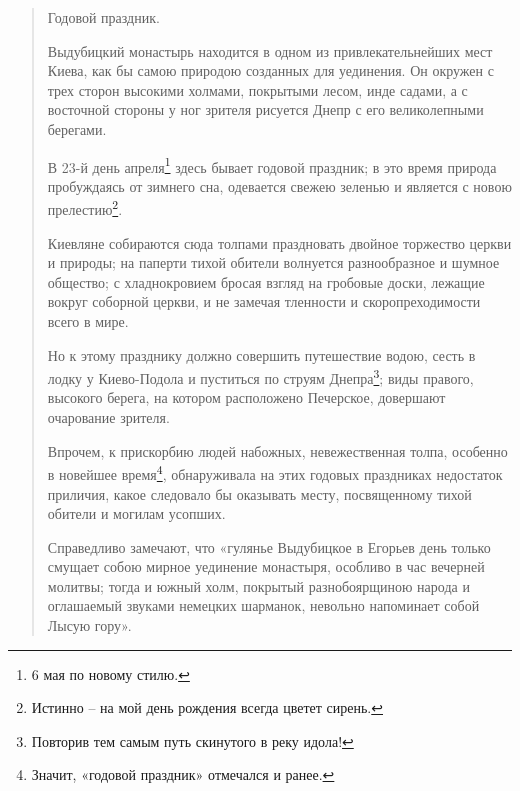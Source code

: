 \begin{quotation}
Годовой праздник.

Выдубицкий монастырь находится в одном из привлекательнейших мест Киева, как бы самою природою созданных для уединения. Он окружен с трех сторон высокими холмами, покрытыми лесом, инде садами, а с восточной стороны у ног зрителя рисуется Днепр с его великолепными берегами.

В 23-й день апреля\footnote{6 мая по новому стилю.} здесь бывает годовой праздник; в это время природа пробуждаясь от зимнего сна, одевается свежею зеленью и является с новою прелестию\footnote{Истинно – на мой день рождения всегда цветет сирень.}. 

Киевляне собираются сюда толпами праздновать двойное торжество церкви и природы; на паперти тихой обители волнуется разнообразное и шумное общество; с хладнокровием бросая взгляд на гробовые доски, лежащие вокруг соборной церкви, и не замечая тленности и скоропреходимости всего в мире.

Но к этому празднику должно совершить путешествие водою, сесть в лодку у Киево-Подола и пуститься по струям Днепра\footnote{Повторив тем самым путь скинутого в реку идола!}; виды правого, высокого берега, на котором расположено Печерское, довершают очарование зрителя.

Впрочем, к прискорбию людей набожных, невежественная толпа, особенно в новейшее время\footnote{Значит, «годовой праздник» отмечался и ранее.}, обнаруживала на этих годовых праздниках недостаток приличия, какое следовало бы оказывать месту, посвященному тихой обители и могилам усопших.

Справедливо замечают, что «гулянье Выдубицкое в Егорьев день только смущает собою мирное уединение монастыря, особливо в час вечерней молитвы; тогда и южный холм, покрытый разнобоярщиною народа и оглашаемый звуками немецких шарманок, невольно напоминает собой Лысую гору».
\end{quotation}

